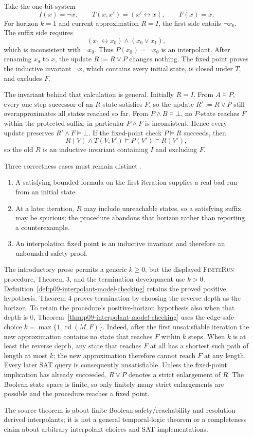 Take the one-bit system
\[
 I(x)=\neg x,\qquad
 T(x,x')=(x'\leftrightarrow x),\qquad
 F(x)=x.
\]
For horizon \(k=1\) and current approximation \(R=I\), the first side entails
\(\neg x_0\).  The suffix side requires
\[
 (x_1\leftrightarrow x_0)\land(x_0\lor x_1),
\]
which is inconsistent with \(\neg x_0\).  Thus \(P(x_0)=\neg x_0\) is an
interpolant.  After renaming \(x_0\) to \(x\), the update
\(R:=R\lor P\) changes nothing.  The fixed point proves the inductive invariant
\(\neg x\), which contains every initial state, is closed under \(T\), and
excludes \(F\).

The invariant behind that calculation is general.  Initially \(R=I\).  From
\(A\models P\), every one-step successor of an \(R\)-state satisfies \(P\), so
the update \(R':=R\lor P\) still overapproximates all states reached so far.
From \(P\land B\models\bot\), no \(P\)-state reaches \(F\) within the protected
suffix; in particular \(P\land F\) is inconsistent.  Hence every update
preserves \(R'\land F\models\bot\).  If the fixed-point check
\(P\models R\) succeeds, then
\[
 R(V)\land T(V,V')\models P(V')\models R(V'),
\]
so the old \(R\) is an inductive invariant containing \(I\) and excluding
\(F\).

Three correctness cases must remain distinct
\cite[thms.~3--4]{McMillan2003}.

\begin{enumerate}
\item A satisfying bounded formula on the first iteration supplies a real bad
run from an initial state.
\item At a later iteration, \(R\) may include unreachable states, so a
satisfying suffix may be spurious; the procedure abandons that horizon rather
than reporting a counterexample.
\item An interpolation fixed point is an inductive invariant and therefore an
unbounded safety proof.
\end{enumerate}

The introductory prose permits a generic \(k\geq0\), but the displayed
\textsc{FiniteRun} procedure, Theorem 3, and the termination development use
\(k>0\).  Definition~\ref{def:p09-interpolant-model-checking} retains the proved
positive hypothesis.  Theorem 4 proves termination by choosing the reverse
depth as the horizon.  To retain the procedure's positive-horizon hypothesis
also when that depth is \(0\),
Theorem~\ref{thm:p09-interpolant-model-checking} uses the edge-safe choice
\(k=\max\{1,\operatorname{rd}(M,F)\}\).  Indeed, after the first unsatisfiable
iteration the new approximation contains no state that reaches \(F\) within
\(k\) steps.  When \(k\) is at least the reverse depth, any state that reaches
\(F\) at all has a shortest such path of length at most \(k\); the new
approximation therefore cannot reach \(F\) at any length.  Every later SAT
query is consequently unsatisfiable.  Unless the fixed-point implication has
already succeeded, \(R\lor P\) denotes a strict enlargement of \(R\).  The
Boolean state space is finite, so only finitely many strict enlargements are
possible and the procedure reaches a fixed point.

The source theorem is about finite Boolean safety/reachability and
resolution-derived interpolants; it is not a general temporal-logic theorem or
a completeness claim about arbitrary interpolant choices and SAT
implementations.
